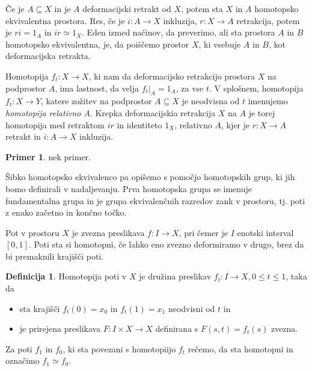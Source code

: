 \documentclass[a4paper,12pt]{article}
\theoremstyle{definition}
\newtheorem{definicija}{Definicija}
\theoremstyle{plain}
\theoremstyle{definition}
\newtheorem{primer}{Primer}
\theoremstyle{plain}
\theoremstyle{plain}
\theoremstyle{plain}
\theoremstyle{plain}
\begin{document}
Če je $A\subseteq X$ in je $A$ deformacijski retrakt od $X$, potem sta 
$X$ in $A$ homotopsko ekvivalentna prostora. Res, če je $i:A\rightarrow
 X$ inkluzija, $r:X\rightarrow A$ retrakcija, potem je $ri=1_A$
  in $ir\simeq1_X$. Eden izmed načinov, da preverimo, ali sta
   prostora $A$ in $B$ homotopsko ekvivalentna, je, da poiščemo prostor
    $X$, ki vsebuje $A$ in $B$, kot deformacijska retrakta. 

Homotopija $f_t: X\rightarrow X$, ki nam da deformacijsko retrakcijo 
prostora $X$ na podprostor $A$, ima lastnost, da velja 
$f_t|_A=1_A$, za vse $t$. V splošnem, homotopija 
$f_t:X\rightarrow Y$, katere zožitev na podprostor $A\subseteq X$ je 
neodvisna od $t$ imenujemo \textit{homotopija relativno A}. Krepka 
deformacijskia retrakcija $X$ na $A$ je torej homotopija med retraktom
 $ir$ in identiteto $1_X$, relativno $A$, kjer je $r:X\rightarrow A$ retrakt in $i:A\rightarrow X$ inkluzija.


\begin{primer}
    nek primer.
\end{primer}

Šibko homotopsko ekvivalenco pa opišemo s pomočjo homotopskih grup, ki
 jih bomo definirali v nadaljevanju. Prva homotopska grupa se imenuje
  fundamentalna grupa in je grupa ekvivalenčnih razredov zank v prostoru, 
 tj. poti z enako začetno in končno točko.

Pot v prostoru $X$ je zvezna preslikava $ f: I \rightarrow X$, pri čemer je $I$ enotski interval $[0,1]$. Poti sta si homotopni, če lahko eno zvezno deformiramo v drugo, brez da bi premaknili krajišči poti.
\begin{definicija}
    
    Homotopija poti v $X$ je družina preslikav $f_t:I \rightarrow X, 0\le t \le 1$, taka da
    \begin{itemize}
        \item 
        sta krajišči $f_t(0) = x_0$ in $f_t(1) = x_1$ neodvisni od $t$ in
        \item 
        je prirejena preslikava $F:I\times X \rightarrow X$ definirana s $F(s,t) = f_t(s)$ zvezna.
    \end{itemize}
    Za poti $f_1$ in $f_0$, ki sta povezani s homotopiijo $f_t$ rečemo, da sta homotopni in označimo $f_1 \simeq f_0$.
\end{definicija}
\end{document}
